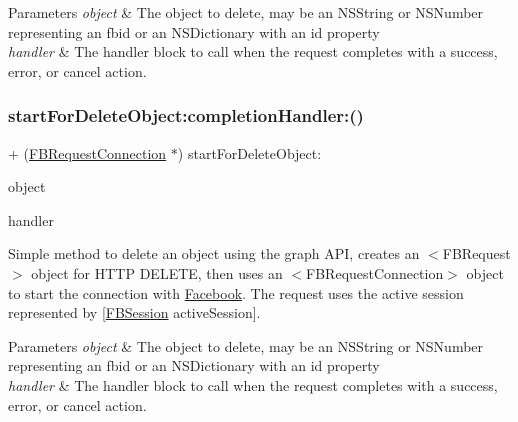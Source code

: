 \begin{DoxyParams}{Parameters}
{\em object} & The object to delete, may be an N\+S\+String or N\+S\+Number representing an fbid or an N\+S\+Dictionary with an id property \\
\hline
{\em handler} & The handler block to call when the request completes with a success, error, or cancel action. \\
\hline
\end{DoxyParams}
\mbox{\label{interfaceFBRequestConnection_a3fc3ae420d8e47fd0b7a6b915622c527}} 
\subsubsection{\texorpdfstring{start\+For\+Delete\+Object\+:completion\+Handler\+:()}{startForDeleteObject:completionHandler:()}\hspace{0.1cm}{\footnotesize\ttfamily [3/5]}}
{\footnotesize\ttfamily + (\hyperlink{interfaceFBRequestConnection}{F\+B\+Request\+Connection} $\ast$) start\+For\+Delete\+Object\+: \begin{DoxyParamCaption}\item[{(id)}]{object }\item[{completionHandler:(F\+B\+Request\+Handler)}]{handler }\end{DoxyParamCaption}}

Simple method to delete an object using the graph A\+PI, creates an $<$\+F\+B\+Request$>$ object for H\+T\+TP D\+E\+L\+E\+TE, then uses an $<$\+F\+B\+Request\+Connection$>$ object to start the connection with \hyperlink{interfaceFacebook}{Facebook}. The request uses the active session represented by {\ttfamily \mbox{[}\hyperlink{interfaceFBSession}{F\+B\+Session} active\+Session\mbox{]}}.


\begin{DoxyParams}{Parameters}
{\em object} & The object to delete, may be an N\+S\+String or N\+S\+Number representing an fbid or an N\+S\+Dictionary with an id property \\
\hline
{\em handler} & The handler block to call when the request completes with a success, error, or cancel action. \\
\hline
\end{DoxyParams}
\mbox{\label{interfaceFBRequestConnection_a3fc3ae420d8e47fd0b7a6b915622c527}} 
